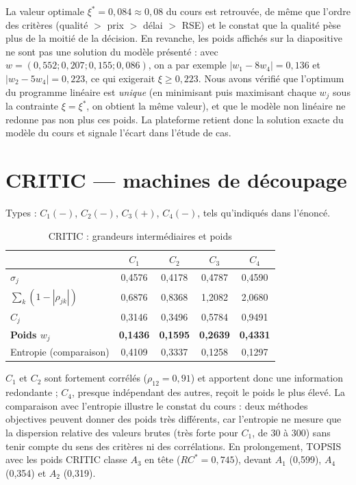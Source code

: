 \documentclass[11pt,a4paper]{report}
\theoremstyle{definition}
\theoremstyle{remark}
\begin{document}
La valeur optimale $\xi^*=0{,}084\approx0{,}08$ du cours est retrouvée, de même que l'ordre des critères
(qualité $>$ prix $>$ délai $>$ RSE) et le constat que la qualité pèse plus de la moitié de la décision. En
revanche, les poids affichés sur la diapositive ne sont pas une solution du modèle présenté : avec
$w=(0{,}552;0{,}207;0{,}155;0{,}086)$, on a par exemple $|w_1-8w_4|=0{,}136$ et $|w_2-5w_4|=0{,}223$,
ce qui exigerait $\xi\ge0{,}223$. Nous avons vérifié que l'optimum du programme linéaire est \emph{unique}
(en minimisant puis maximisant chaque $w_j$ sous la contrainte $\xi=\xi^*$, on obtient la même valeur), et
que le modèle non linéaire ne redonne pas non plus ces poids. La plateforme retient donc la solution exacte
du modèle du cours et signale l'écart dans l'étude de cas.

\section{CRITIC --- machines de découpage}

Types : $C_1(-)$, $C_2(-)$, $C_3(+)$, $C_4(-)$, tels qu'indiqués dans l'énoncé.

\begin{table}[H]
\centering
\caption{CRITIC : grandeurs intermédiaires et poids}\label{tab:critic}
\begin{tabular}{lcccc}
\toprule
 & $C_1$ & $C_2$ & $C_3$ & $C_4$\\
\midrule
$\sigma_j$ & 0,4576 & 0,4178 & 0,4787 & 0,4590\\
$\sum_k(1-|\rho_{jk}|)$ & 0,6876 & 0,8368 & 1,2082 & 2,0680\\
$C_j$ & 0,3146 & 0,3496 & 0,5784 & 0,9491\\
\textbf{Poids $w_j$} & \textbf{0,1436} & \textbf{0,1595} & \textbf{0,2639} & \textbf{0,4331}\\
\midrule
Entropie (comparaison) & 0,4109 & 0,3337 & 0,1258 & 0,1297\\
\bottomrule
\end{tabular}
\end{table}

$C_1$ et $C_2$ sont fortement corrélés ($\rho_{12}=0{,}91$) et apportent donc une information redondante ;
$C_4$, presque indépendant des autres, reçoit le poids le plus élevé. La comparaison avec l'entropie
illustre le constat du cours : deux méthodes objectives peuvent donner des poids très différents, car
l'entropie ne mesure que la dispersion relative des valeurs brutes (très forte pour $C_1$, de 30 à 300) sans
tenir compte du sens des critères ni des corrélations. En prolongement, TOPSIS avec les poids CRITIC classe
$A_3$ en tête ($RC^*=0{,}745$), devant $A_1$ (0,599), $A_4$ (0,354) et $A_2$ (0,319).
\end{document}
